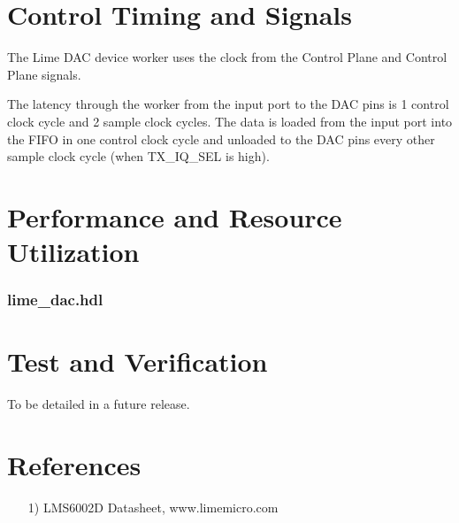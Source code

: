 \documentclass{article}
\def\comp{lime\_dac}
\edef\ecomp{lime_dac}
\begin{document}
		\section*{Control Timing and Signals}
		The Lime DAC device worker uses the clock from the Control Plane and Control Plane signals.\par\bigskip
		\noindent The latency through the worker from the input port to the DAC pins is 1 control clock cycle and 2 sample clock cycles. The data is loaded from the input port into the FIFO in one control clock cycle and unloaded to the DAC pins every other sample clock cycle (when TX\_IQ\_SEL is high).

		\section*{Performance and Resource Utilization}
		\subsubsection*{\comp.hdl}

	\section*{Test and Verification}
	\begin{flushleft}
	 To be detailed in a future release.
	\end{flushleft}
	\section*{References}
	\begin{flushleft}
		\begin{itemize}
			\item[1)] LMS6002D Datasheet, www.limemicro.com
		\end{itemize}
	\end{flushleft}
\end{document}
